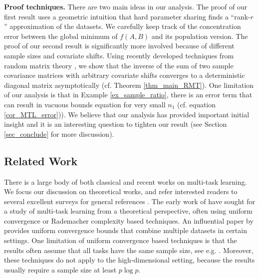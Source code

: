 \textbf{Proof techniques.}
There are two main ideas in our analysis. The proof of our first result uses a geometric intuition that hard parameter sharing finds a ``rank-$r$'' approximation of the datasets.
We carefully keep track of the concentration error between the global minimum of $f(A, B)$ and its population version.
The proof of our second result is significantly more involved because of different sample sizes and covariate shifts. Using recently developed techniques from random matrix theory \cite{Anisotropic}, we show that the inverse of the sum of two sample covariance matrices with arbitrary covariate shifts converges to a deterministic diagonal matrix asymptotically (cf. Theorem \ref{thm_main_RMT}). %
One limitation of our analysis is that in Example \ref{ex_sample_ratio}, there is an error term that can result in vacuous bounds equation for very small $n_1$ (cf. equation \eqref{cor_MTL_error})).
We believe that our analysis has provided important initial insight and it is an interesting question to tighten our result (see Section \ref{sec_conclude} for more discussion).



\subsection{Related Work}

There is a large body of both classical and recent works on multi-task learning.
We focus our discussion on theoretical works, and refer interested readers to several excellent surveys for general references \cite{PY09,R17,ZY17,V20}.
The early work of \citet{B00,BS03,M06} have sought for a study of multi-task learning from a theoretical perspective, often using uniform convergence or Rademacher complexity based techniques.
An influential paper by \citet{BBCK10} provides uniform convergence bounds that combine multiple datasets in certain settings.
One limitation of uniform convergence based techniques is that the results often assume that all  tasks have the same sample size, see e.g. \citet{B00,MPR16}.
Moreover, these techniques do not apply to the high-dimensional setting, because the results usually require a sample size at least $p \log p$.

